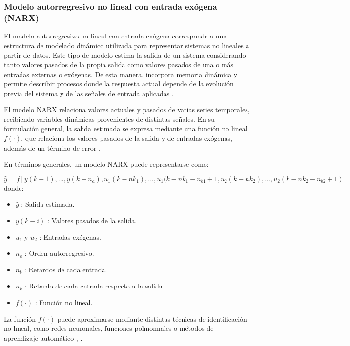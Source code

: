 \documentclass[11pt]{report}
\begin{document}
\subsubsection{ Modelo autorregresivo no lineal con entrada exógena (NARX)}

El modelo autorregresivo no lineal con entrada exógena corresponde a una estructura de modelado dinámico utilizada para representar sistemas no lineales a partir de datos. Este tipo de modelo estima la salida de un sistema considerando tanto valores pasados de la propia salida como valores pasados de una o más entradas externas o exógenas. De esta manera, incorpora memoria dinámica y permite describir procesos donde la respuesta actual depende de la evolución previa del sistema y de las señales de entrada aplicadas \cite{BALALI2023113496}.

El modelo NARX relaciona valores actuales y pasados de varias series temporales, recibiendo variables dinámicas provenientes de distintas señales. En su formulación general, la salida estimada se expresa mediante una función no lineal $f(\cdot)$, que relaciona los valores pasados de la salida y de entradas exógenas, además de un término de error \cite{montero2024modelo}.

En términos generales, un modelo NARX puede representarse como:

\begin{equation}    \label{ecuacionNARX}
{\hat{y}}=f[y(k-1),...,y(k-n_a),u_1(k-nk_1),...,u_1(k-nk_1-n_{b1}+1,u_2(k-nk_2),...,u_2(k-nk_2-n_{b2}+1)]
\end{equation}
donde:
\begin{itemize}
    \item $\hat{y}$ : Salida estimada.
    \item $y(k-i)$ : Valores pasados de la salida.
    \item $u_1$ y $u_2$ : Entradas exógenas.
    \item $n_a$ : Orden autorregresivo.
    \item $n_b$ : Retardos de cada entrada.
    \item $n_k$ : Retardo de cada entrada respecto a la salida.
    \item $f(\cdot)$ : Función no lineal.
\end{itemize}

La función $f(\cdot)$ puede aproximarse mediante distintas técnicas de identificación no lineal, como redes neuronales, funciones polinomiales o métodos de aprendizaje automático \cite{barbosa2010tecnicas}, \cite{montero2024modelo}.
\end{document}
